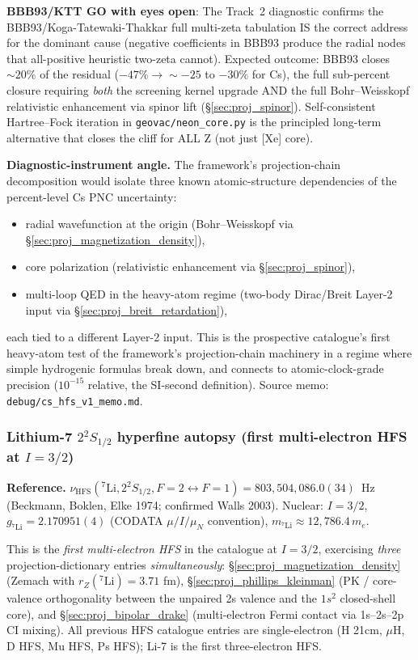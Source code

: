 \documentclass[11pt]{article}
\begin{document}
\textbf{BBB93/KTT GO with eyes open}: The Track~2 diagnostic confirms
the BBB93/Koga-Tatewaki-Thakkar full multi-zeta tabulation IS the
correct address for the dominant cause (negative coefficients in
BBB93 produce the radial nodes that all-positive heuristic two-zeta
cannot).  Expected outcome: BBB93 closes $\sim 20\%$ of the residual
($-47\% \to \sim -25$ to $-30\%$ for Cs), the full sub-percent closure
requiring \emph{both} the screening kernel upgrade AND the full
Bohr--Weisskopf relativistic enhancement via spinor lift
(\S\ref{sec:proj_spinor}).  Self-consistent Hartree--Fock iteration
in \texttt{geovac/neon\_core.py} is the principled long-term
alternative that closes the cliff for ALL Z (not just [Xe] core).

\textbf{Diagnostic-instrument angle.}  The framework's projection-chain
decomposition would isolate three known atomic-structure
dependencies of the percent-level Cs PNC uncertainty:
\begin{itemize}\setlength\itemsep{0pt}
\item radial wavefunction at the origin (Bohr--Weisskopf via
\S\ref{sec:proj_magnetization_density}),
\item core polarization (relativistic enhancement via
\S\ref{sec:proj_spinor}),
\item multi-loop QED in the heavy-atom regime (two-body Dirac/Breit
Layer-2 input via \S\ref{sec:proj_breit_retardation}),
\end{itemize}
each tied to a different Layer-2 input.  This is the prospective
catalogue's first heavy-atom test of the framework's projection-chain
machinery in a regime where simple hydrogenic formulas break down,
and connects to atomic-clock-grade precision ($10^{-15}$ relative,
the SI-second definition).  Source memo:
\texttt{debug/cs\_hfs\_v1\_memo.md}.

\subsubsection{Lithium-7 $2{}^2S_{1/2}$ hyperfine autopsy (first multi-electron HFS at $I=3/2$)}
\label{sec:autopsy_li7_hfs}

\textbf{Reference.}  $\nu_\text{HFS}({}^7\text{Li}, 2{}^2S_{1/2},
F=2 \leftrightarrow F=1) = 803{,}504{,}086.0(34)$~Hz
(Beckmann, Boklen, Elke 1974; confirmed Walls 2003).  Nuclear:
$I=3/2$, $g_{{}^7\text{Li}} = 2.170951(4)$ (CODATA $\mu/I/\mu_N$
convention), $m_{{}^7\text{Li}} \approx 12{,}786.4\,m_e$.

This is the \emph{first multi-electron HFS} in the catalogue at
$I=3/2$, exercising \emph{three} projection-dictionary entries
\emph{simultaneously}: \S\ref{sec:proj_magnetization_density}
(Zemach with $r_Z({}^7\text{Li}) = 3.71$ fm),
\S\ref{sec:proj_phillips_kleinman} (PK / core-valence orthogonality
between the unpaired 2s valence and the $1s^2$ closed-shell core),
and \S\ref{sec:proj_bipolar_drake} (multi-electron Fermi contact
via 1s--2s--2p CI mixing).  All previous HFS catalogue entries
are single-electron (H 21cm, $\mu$H, D HFS, Mu HFS, Ps HFS); Li-7
is the first three-electron HFS.
\end{document}
